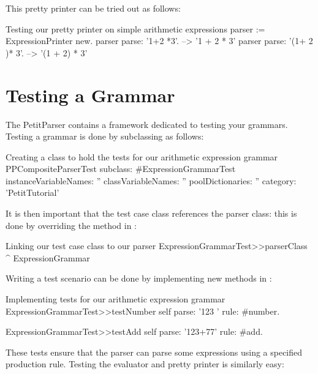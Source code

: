 \documentclass[a4paper,10pt,twoside]{book}
\begin{document}
This pretty printer can be tried out as follows:

\begin{script}{Testing our pretty printer on simple arithmetic expressions}
parser := ExpressionPrinter new.
parser parse: '1+2 *3'.          --> '1 + 2 * 3'
parser parse: '(1+ 2 )* 3'.      --> '(1 + 2) * 3'
\end{script}

\section{Testing a Grammar}

The PetitParser contains a framework dedicated to testing your
grammars. Testing a grammar is done by subclassing
 as follows:

\begin{script}{Creating a class to hold the tests for our arithmetic expression grammar}
PPCompositeParserTest subclass: #ExpressionGrammarTest
  instanceVariableNames: ''
  classVariableNames: ''
  poolDictionaries: ''
  category: 'PetitTutorial'
\end{script}

It is then important that the test case class references the parser
class: this is done by overriding the
 method in
:

\begin{script}{Linking our test case class to our parser}
ExpressionGrammarTest>>parserClass
  ^ ExpressionGrammar
\end{script}

Writing a test scenario can be done by implementing new methods in
:

\begin{script}{Implementing tests for our arithmetic expression grammar}
ExpressionGrammarTest>>testNumber
  self parse: '123 ' rule: #number.

ExpressionGrammarTest>>testAdd
  self parse: '123+77' rule: #add.
\end{script}

These tests ensure that the  parser can parse
some expressions using a specified production rule. Testing the
evaluator and pretty printer is similarly easy:
\end{document}

